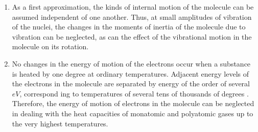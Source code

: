 \begin{enumerate}[label=(\alph*)]
\item As a first approximation, the kinds of internal motion
of the molecule can be assumed independent of one another. Thus, at small amplitudes of vibration of the nuclei, the changes in the moments of inertia  of the molecule due to vibra­tion can be neglected, as can the effect of the vibrational motion in the molecule on its rotation.
\item No changes in the energy of motion of the electrons occur when a substance is heated by one degree at ordinary tempera­tures. Adjacent energy levels of the electrons in the molecule are separated by energy of the order of several $eV$, correspond­ ing to temperatures of several tens of thousands of degrees . Therefore, the energy of motion of electrons in the molecule can be neglected in dealing with the heat capacities of monatomic and polyatomic gases up to the very highest temperatures.
\end{enumerate}

